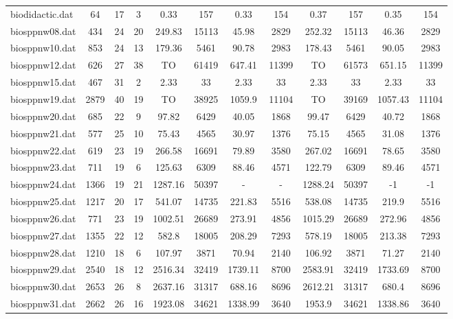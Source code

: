 \begin{sidewaystable}[!ht]
{\begin{tabular}{lccccccccccc}
biodidactic.dat & 64 & 17 & 3 & 0.33 & 157 & 0.33 & 154 & 0.37 & 157 & 0.35 & 154 \\
biosppnw08.dat & 434 & 24 & 20 & 249.83 & 15113 &  \textcolor{blue2}{45.98} & 2829 & 252.32 & 15113 & 46.36 & 2829 \\
biosppnw10.dat & 853 & 24 & 13 & 179.36 & 5461 & 90.78 & 2983 & 178.43 & 5461 &  \textcolor{blue2}{90.05} & 2983 \\
biosppnw12.dat & 626 & 27 & 38 &  TO & 61419 &  \textcolor{blue2}{647.41} & 11399 &  TO & 61573 & 651.15 & 11399 \\
biosppnw15.dat & 467 & 31 & 2 & 2.33 & 33 & 2.33 & 33 & 2.33 & 33 & 2.33 & 33 \\
biosppnw19.dat & 2879 & 40 & 19 &  TO & 38925 & 1059.9 & 11104 &  TO & 39169 & 1057.43 & 11104 \\
biosppnw20.dat & 685 & 22 & 9 & 97.82 & 6429 & 40.05 & 1868 & 99.47 & 6429 & 40.72 & 1868 \\
biosppnw21.dat & 577 & 25 & 10 & 75.43 & 4565 &  \textcolor{blue2}{30.97} & 1376 & 75.15 & 4565 & 31.08 & 1376 \\
biosppnw22.dat & 619 & 23 & 19 & 266.58 & 16691 & 79.89 & 3580 & 267.02 & 16691 & 78.65 & 3580 \\
biosppnw23.dat & 711 & 19 & 6 & 125.63 & 6309 &  \textcolor{blue2}{88.46} & 4571 & 122.79 & 6309 & 89.46 & 4571 \\
biosppnw24.dat & 1366 & 19 & 21 & 1287.16 & 50397 &  - &  - & 1288.24 & 50397 & -1 & -1 \\
biosppnw25.dat & 1217 & 20 & 17 & 541.07 & 14735 & 221.83 & 5516 & 538.08 & 14735 &  \textcolor{blue2}{219.9} & 5516 \\
biosppnw26.dat & 771 & 23 & 19 & 1002.51 & 26689 & 273.91 & 4856 & 1015.29 & 26689 &  \textcolor{blue2}{272.96} & 4856 \\
biosppnw27.dat & 1355 & 22 & 12 & 582.8 & 18005 &  \textcolor{blue2}{208.29} & 7293 & 578.19 & 18005 & 213.38 & 7293 \\
biosppnw28.dat & 1210 & 18 & 6 & 107.97 & 3871 &  \textcolor{blue2}{70.94} & 2140 & 106.92 & 3871 & 71.27 & 2140 \\
biosppnw29.dat & 2540 & 18 & 12 & 2516.34 & 32419 & 1739.11 & 8700 & 2583.91 & 32419 &  \textcolor{blue2}{1733.69} & 8700 \\
biosppnw30.dat & 2653 & 26 & 8 & 2637.16 & 31317 & 688.16 & 8696 & 2612.21 & 31317 & 680.4 & 8696 \\
biosppnw31.dat & 2662 & 26 & 16 & 1923.08 & 34621 & 1338.99 & 3640 & 1953.9 & 34621 & 1338.86 & 3640 \\

\end{tabular}}
\end{sidewaystable}
